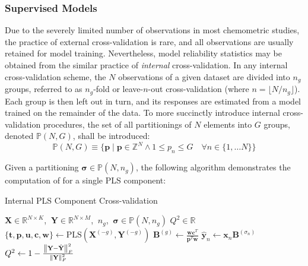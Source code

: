 \subsubsection{Supervised Models}

\begin{doublespace}
Due to the severely limited number of observations in most chemometric studies,
the practice of external cross-validation is rare, and all observations are
usually retained for model training. Nevertheless, model reliability statistics
may be obtained from the similar practice of \emph{internal} cross-validation.
In any internal cross-validation scheme, the $N$ observations of a given
dataset are divided into $n_g$ groups, referred to as $n_g$-fold or
leave-$n$-out cross-validation (where $n = \lfloor N / n_g \rfloor$). Each
group is then left out in turn, and its responses are estimated from a model
trained on the remainder of the data. To more succinctly introduce internal
cross-validation procedures, the set of all partitionings of $N$ elements into
$G$ groups, denoted $\mathbb{P}(N, G)$, shall be introduced:
\begin{equation}
\mathbb{P}(N, G) \equiv \big\{
 \mathbf{p} \mid \mathbf{p} \in \mathbb{Z}^N
 \wedge
 1 \le p_n \le G
 \quad \forall n \in \{1, \dots N\}
\big\}
\end{equation}

Given a partitioning $\boldsymbol{\sigma} \in \mathbb{P}(N,n_g)$, the following
algorithm demonstrates the computation of \qsq{} for a single PLS component:
\end{doublespace}

\begin{algorithm}[H]
\caption{Internal PLS Component Cross-validation}
\label{algorithm.3.8}
\begin{algorithmic}[1]
\REQUIRE $\mathbf{X} \in \mathbb{R}^{N \times K}$,%
       $\:\mathbf{Y} \in \mathbb{R}^{N \times M}$,%
       $\:n_g$, $\:\boldsymbol{\sigma} \in \mathbb{P}(N, n_g)$
\ENSURE $Q^2 \in \mathbb{R}$
  \STATE $\{\mathbf{t}, \mathbf{p}, \mathbf{u}, \mathbf{c}, \mathbf{w}\}
          \gets \mathrm{PLS}(\mathbf{X}^{(-g)}, \mathbf{Y}^{(-g)})$ 
  \STATE $\mathbf{B}^{(g)} \gets \tfrac{\mathbf{w} \mathbf{c}^T}
                                       {\mathbf{p}^T \mathbf{w}}$
\ENDFOR
{}
  \STATE $\hat{\mathbf{y}}_n \gets
          \mathbf{x}_n \mathbf{B}^{(\sigma_n)}$ 
\ENDFOR
\STATE $Q^2 \gets 1 - \frac{\left\| \mathbf{Y} - \hat{\mathbf{Y}} \right\|_F^2}
                           {\left\| \mathbf{Y} \right\|_F^2}$
\end{algorithmic}
\end{algorithm}


